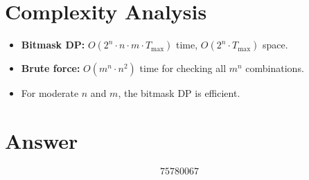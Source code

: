 \documentclass[11pt]{article}
\begin{document}
\section{Complexity Analysis}
\begin{itemize}
    \item \textbf{Bitmask DP:} $O(2^n \cdot n \cdot m \cdot T_{\max})$ time, $O(2^n \cdot T_{\max})$ space.
    \item \textbf{Brute force:} $O(m^n \cdot n^2)$ time for checking all $m^n$ combinations.
    \item For moderate $n$ and $m$, the bitmask DP is efficient.
\end{itemize}

\section{Answer}

\[
\boxed{75780067}
\]
\end{document}
